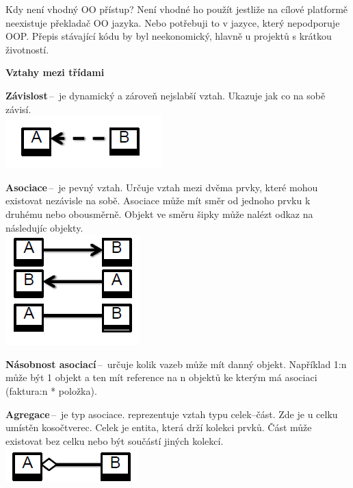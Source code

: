 Kdy není vhodný OO přístup? Není vhodné ho použít jestliže na cílové platformě neexistuje překladač OO jazyka. Nebo potřebuji to v jazyce, který nepodporuje OOP. Přepis stávající kódu by byl neekonomický, hlavně u projektů s krátkou životností.

\begin{Large}\vspace{0,5cm} \textbf{Vztahy mezi třídami}
\end{Large}

\textbf{Závislost}\,--\, je dynamický a zároveň nejslabší vztah. Ukazuje jak co na sobě závisí.\\
\includegraphics[scale=1]{BPC-TIN/images/zavislost.PNG}

\textbf{Asociace}\,--\, je pevný vztah. Určuje vztah mezi dvěma prvky, které mohou existovat nezávisle na sobě. Asociace může mít směr od jednoho prvku k druhému nebo obousměrně. Objekt ve směru šipky může nalézt odkaz na následujíc objekty. \\
\includegraphics[scale=1]{BPC-TIN/images/asociace.PNG}

\textbf{Násobnost asociací}\,--\, určuje kolik vazeb může mít danný objekt. Například 1:n může být 1 objekt a ten mít reference na n objektů ke kterým má asociaci (faktura:n * položka).

\textbf{Agregace}\,--\, je typ asociace. reprezentuje vztah typu celek--část. Zde je u celku umístěn kosočtverec. Celek je entita, která drží kolekci prvků. Část může existovat bez celku nebo být součástí jiných kolekcí. \\\includegraphics[scale=1]{BPC-TIN/images/agregace.PNG}

